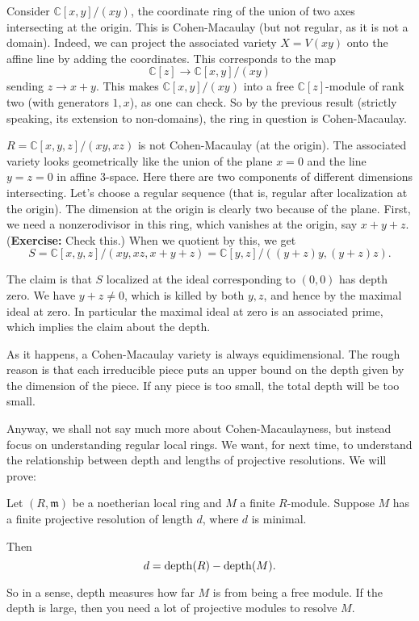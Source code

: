 \begin{example} 
Consider $\mathbb{C}[x,y]/(xy)$, the coordinate ring of the
union of two axes
intersecting at the origin. This is Cohen-Macaulay (but not
regular, as it
is not a domain). Indeed, we can project the associated variety
$X = V(xy)$
onto the affine line by adding the coordinates. This corresponds
to the map
\[ \mathbb{C}[z] \to \mathbb{C}[x,y]/(xy)  \]
sending $z \to x+y$. This makes $\mathbb{C}[x,y]/(xy)$ into a
free
$\mathbb{C}[z]$-module of rank two (with generators $1, x$), as
one can check.
So by the previous result (strictly speaking, its extension to
non-domains),
the ring in question is Cohen-Macaulay.
\end{example} 

\begin{example} 
$R=\mathbb{C}[x,y,z]/(xy, xz)$ is not Cohen-Macaulay (at the
origin). The associated variety looks
geometrically like the union of the plane $x=0$ and the line
$y=z=0$ in affine
3-space. Here there are two components of different dimensions
intersecting.
Let's choose a regular sequence (that is, regular after
localization at the
origin). The dimension at the origin is clearly two because of
the plane.
First, we need a nonzerodivisor in this ring, which vanishes at
the origin, say
$ x+y+z$. (\textbf{Exercise:} Check this.) When we quotient by
this, we get
\[ S=\mathbb{C}[x,y,z]/(xy,xz, x+y+z) = \mathbb{C}[y,z]/(
(y+z)y, (y+z)z). \]

The claim is that $S$ localized at the ideal corresponding to
$(0,0)$ has depth
zero. We have $y+z \neq 0$, which is killed by both $y,z$, and
hence by the
maximal ideal at zero. In particular the maximal ideal at zero
is an associated
prime, which implies the claim about the depth.
\end{example} 

As it happens, a Cohen-Macaulay variety is always
equidimensional. The rough
reason is that each irreducible piece puts an upper bound on the
depth given by
the dimension of the piece. If any piece is too small, the total
depth will be
too small. 

Anyway, we shall not say much more about Cohen-Macaulayness, but
instead focus
on understanding regular local rings. We want, for next time, to
understand the relationship
between depth and lengths of projective resolutions.
We will prove:

\begin{theorem} Let $(R,
\mathfrak{m})$ be a
noetherian local ring and $M$ a finite $R$-module. Suppose $M$
has a finite
projective resolution of length $d$, where $d$ is minimal. 

Then
\[ d = \mathrm{depth}(R) - \mathrm{depth}(M).  \]
\end{theorem} 
So in a sense, depth measures how far $M$ is from being a free
module. If the
depth is large, then you need a lot of projective modules to
resolve $M$.

